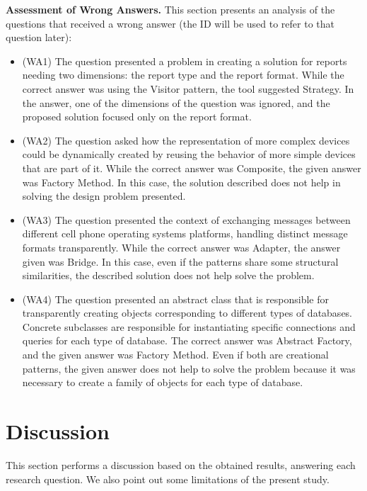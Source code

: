 \documentclass[runningheads]{llncs}
\begin{document}
\textbf{Assessment of Wrong Answers.} This section presents an analysis of the questions that received a wrong answer (the ID will be used to refer to that question later):

\begin{itemize}
    \item (WA1) The question presented a problem in creating a solution for reports needing two dimensions: the report type and the report format. While the correct answer was using the Visitor pattern, the tool suggested Strategy. In the answer, one of the dimensions of the question was ignored, and the proposed solution focused only on the report format.
    \item (WA2) The question asked how the representation of more complex devices could be dynamically created by reusing the behavior of more simple devices that are part of it. While the correct answer was Composite, the given answer was Factory Method. In this case, the solution described does not help in solving the design problem presented.
    \item (WA3) The question presented the context of exchanging messages between different cell phone operating systems platforms, handling distinct message formats transparently. While the correct answer was Adapter, the answer given was Bridge. In this case, even if the patterns share some structural similarities, the described solution does not help solve the problem.
    \item (WA4)  The question presented an abstract class that is responsible for transparently creating objects corresponding to different types of databases. Concrete subclasses are responsible for instantiating specific connections and queries for each type of database. The correct answer was Abstract Factory, and the given answer was Factory Method. Even if both are creational patterns, the given answer does not help to solve the problem because it was necessary to create a family of objects for each type of database.
\end{itemize}

\section{Discussion}\label{sec5}

This section performs a discussion based on the obtained results, answering each research question. We also point out some limitations of the present study.
\end{document}
